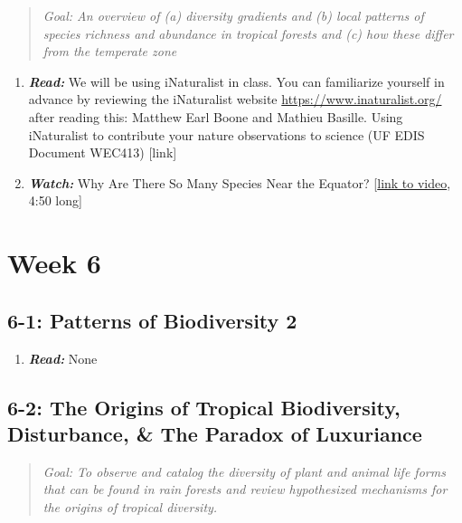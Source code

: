 \documentclass[
  10pt,
  letterpaper,
  oneside,
  open=any]{scrbook}
\providecommand{\tightlist}{%
  \setlength{\itemsep}{0pt}\setlength{\parskip}{0pt}}\usepackage{longtable,booktabs,array}
\begin{document}
\begin{quote}
\emph{Goal: An overview of (a) diversity gradients and (b) local
patterns of species richness and abundance in tropical forests and (c)
how these differ from the temperate zone}
\end{quote}

\begin{enumerate}
\def\labelenumi{\arabic{enumi}.}
\item
  \textbf{\emph{Read:}} We will be using iNaturalist in class. You can
  familiarize yourself in advance by reviewing the iNaturalist website
  \url{https://www.inaturalist.org/} after reading this: Matthew Earl
  Boone and Mathieu Basille. Using iNaturalist to contribute your nature
  observations to science (UF EDIS Document WEC413) {[}link{]}
\item
  \textbf{\emph{Watch:}} Why Are There So Many Species Near the Equator?
  {[}\href{https://www.youtube.com/watch?v=IrbKix96_k0}{link to video},
  4:50 long{]}
\end{enumerate}

\section{Week 6}\label{week-6}

\subsection*{6-1: Patterns of Biodiversity
2}\label{patterns-of-biodiversity-2}

\begin{enumerate}
\def\labelenumi{\arabic{enumi}.}
\tightlist
\item
  \textbf{\emph{Read:}} None
\end{enumerate}

\subsection*{6-2: The Origins of Tropical Biodiversity, Disturbance, \&
The Paradox of
Luxuriance}\label{the-origins-of-tropical-biodiversity-disturbance-the-paradox-of-luxuriance}

\begin{quote}
\emph{Goal: To observe and catalog the diversity of plant and animal
life forms that can be found in rain forests and review hypothesized
mechanisms for the origins of tropical diversity.}
\end{quote}
\end{document}
